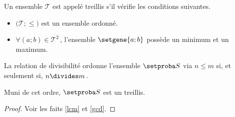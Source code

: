 Un ensemble $\mathcal{T}$ est appelé treillis s'il vérifie les conditions suivantes.
%
	\begin{itemize}
		\item $\big( \mathcal{T} ; \leq \big)$ est un ensemble ordonné.

		\item $\forall (a ; b) \in \mathcal{T}^2$\,, l'ensemble $\setgene{a ; b}$ possède un minimum et un maximum.
	\end{itemize}

\begin{fact}
	La relation de divisibilité ordonne l'ensemble $\ourset$ via $n  \leq m$ si, et seulement si, $n \divides m$\,.
	
	\medskip
	
	Muni de cet ordre, $\ourset$ est un treillis.
\end{fact}

\begin{proof}
	Voir les faits \ref{lcm} et \ref{gcd}.
\end{proof}




